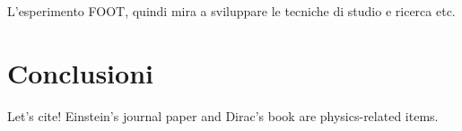 \documentclass[12pt,a4paper,twoside]{report}
\begin{document}
	L'esperimento FOOT, quindi mira a sviluppare le tecniche di studio e ricerca etc.
	
	
	
	
	
	
			
	
	\chapter*{Conclusioni}
		Let's cite! Einstein's journal paper \cite{einstein} and Dirac's book \cite{dirac} are physics-related items.
	\newpage	
	\printbibliography[
		heading=bibintoc,
		title={Bibliografia}
		]
		 	
\end{document}
